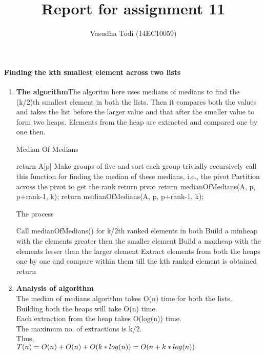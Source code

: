 \documentclass[a4paper,11pt]{article}
\title{Report for assignment 11}
\author{Vasudha Todi (14EC10059)}
\begin{document}
\maketitle

\paragraph{Finding the kth smallest element across two lists}
\begin{enumerate}
 \item \textbf{The algorithm}The algoritm here uses medians of medians to find the (k/2)th smallest element in both the lists. Then it compares both the values and takes the list before the larger value and that after the smaller value to form two heaps. Elements from the heap are extracted and compared one by one then.\\
  \begin{algorithm}
    \caption{Median Of Medians}
    \begin{algorithmic}[1]
        \State return A[p]
    \EndIf
    \State Make groups of five and sort each group trivially
    \State recursively call this function for finding the median of these medians, i.e., the pivot
    \State Partition across the pivot to get the rank
        \State return pivot
        \State return medianOfMedians(A, p, p+rank-1, k);
    \EndIf
    \State return medianOfMedians(A, p, p+rank-1, k);
    \end{algorithmic}
  \end{algorithm}

  \begin{algorithm}
    \caption{The process}
    \begin{algorithmic}[1]
    \State Call medianOfMedians() for k/2th ranked elements in both
    \State Build a minheap with the elements greater then the smaller element
    \State Build a maxheap with the elements lesser than the larger element
    \State Extract elements from both the heaps one by one and compare within them till the kth ranked element is obtained
    \State return
    \end{algorithmic}
  \end{algorithm}

\item \textbf{Analysis of algorithm}\\
The median of medians algorithm takes O(n) time for both the lists.\\
Building both the heaps will take O(n) time.\\
Each extraction from the heap takes O(log(n)) time.\\
The maximum no. of extractions is k/2.\\
Thus,\\
$T(n) = O(n) + O(n) + O(k*log(n))\\
     = O(n + k*log(n))$

\end{enumerate}
\end{document}
